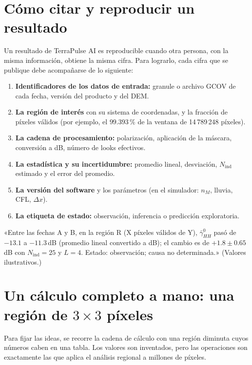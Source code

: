 \documentclass[11pt,a4paper]{article}
\begin{document}
\section{Cómo citar y reproducir un resultado}
\label{sec:reproducir}

Un resultado de TerraPulse AI es reproducible cuando otra persona, con la misma información, obtiene la
misma cifra. Para lograrlo, cada cifra que se publique debe acompañarse de lo siguiente:
\begin{enumerate}
  \item \textbf{Identificadores de los datos de entrada:} granule o archivo GCOV de cada fecha, versión del
        producto y del DEM.
  \item \textbf{La región de interés} con su sistema de coordenadas, y la fracción de píxeles válidos
        (por ejemplo, el $99.393\,\mathrm{\%}$ de la ventana de 14\,789\,248 píxeles). 
  \item \textbf{La cadena de procesamiento:} polarización, aplicación de la máscara, conversión a dB, número de
        looks efectivos.
  \item \textbf{La estadística y su incertidumbre:} promedio lineal, desviación, $N_{\mathrm{ind}}$ estimado y
        el error del promedio.
  \item \textbf{La versión del software} y los parámetros (en el simulador: $n_M$, lluvia, CFL, $\Delta x$).
  \item \textbf{La etiqueta de estado:} observación, inferencia o predicción exploratoria.
\end{enumerate}

\begin{ejemplo}
«Entre las fechas A y B, en la región R (X píxeles válidos de Y), $\bar\gamma^0_{HH}$ pasó de $-13.1$ a
$-11.3$\,dB (promedio lineal convertido a dB); el cambio es de $+1.8\pm0.65$\,dB con $N_{\mathrm{ind}}=25$ y
$L=4$. Estado: observación; causa no determinada.» (Valores ilustrativos.)
\end{ejemplo}


\section{Un cálculo completo a mano: una región de $3\times3$ píxeles}
\label{sec:mano}

Para fijar las ideas, se recorre la cadena de cálculo con una región diminuta cuyos números caben en una
tabla. Los valores son inventados, pero las operaciones son exactamente las que aplica el análisis regional
a millones de píxeles.
\end{document}
